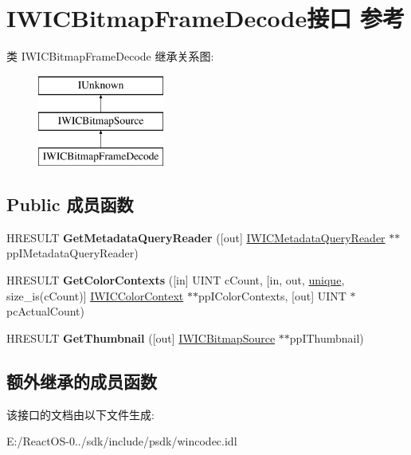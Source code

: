 \hypertarget{interface_i_w_i_c_bitmap_frame_decode}{}\section{I\+W\+I\+C\+Bitmap\+Frame\+Decode接口 参考}
\label{interface_i_w_i_c_bitmap_frame_decode}
类 I\+W\+I\+C\+Bitmap\+Frame\+Decode 继承关系图\+:\begin{figure}[H]
\begin{center}
\leavevmode
\includegraphics[height=3.000000cm]{interface_i_w_i_c_bitmap_frame_decode}
\end{center}
\end{figure}
\subsection*{Public 成员函数}
\begin{DoxyCompactItemize}
\item 
\mbox{\label{interface_i_w_i_c_bitmap_frame_decode_a5271933488a31d49668c404e43646269}} 
H\+R\+E\+S\+U\+LT {\bfseries Get\+Metadata\+Query\+Reader} (\mbox{[}out\mbox{]} \hyperlink{interface_i_w_i_c_metadata_query_reader}{I\+W\+I\+C\+Metadata\+Query\+Reader} $\ast$$\ast$pp\+I\+Metadata\+Query\+Reader)
\item 
\mbox{\label{interface_i_w_i_c_bitmap_frame_decode_a9593437d9e0c0ac2e698c9b3bca7bbf6}} 
H\+R\+E\+S\+U\+LT {\bfseries Get\+Color\+Contexts} (\mbox{[}in\mbox{]} U\+I\+NT c\+Count, \mbox{[}in, out, \hyperlink{interfaceunique}{unique}, size\+\_\+is(c\+Count)\mbox{]} \hyperlink{interface_i_w_i_c_color_context}{I\+W\+I\+C\+Color\+Context} $\ast$$\ast$pp\+I\+Color\+Contexts, \mbox{[}out\mbox{]} U\+I\+NT $\ast$pc\+Actual\+Count)
\item 
\mbox{\label{interface_i_w_i_c_bitmap_frame_decode_a048f6959f1831d8bb945687d83834434}} 
H\+R\+E\+S\+U\+LT {\bfseries Get\+Thumbnail} (\mbox{[}out\mbox{]} \hyperlink{interface_i_w_i_c_bitmap_source}{I\+W\+I\+C\+Bitmap\+Source} $\ast$$\ast$pp\+I\+Thumbnail)
\end{DoxyCompactItemize}
\subsection*{额外继承的成员函数}


该接口的文档由以下文件生成\+:\begin{DoxyCompactItemize}
\item 
E\+:/\+React\+O\+S-\/0../sdk/include/psdk/wincodec.\+idl\end{DoxyCompactItemize}
